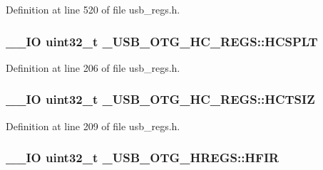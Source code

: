 Definition at line 520 of file usb\-\_\-regs.\-h.

\hypertarget{group___u_s_b___o_t_g___d_r_i_v_e_r_ga25824318899e3094e96b30151084a6c3}{
\subsubsection[{H\-C\-S\-P\-L\-T}]{\setlength{\rightskip}{0pt plus 5cm}\-\_\-\-\_\-\-I\-O {\bf uint32\-\_\-t} \-\_\-\-U\-S\-B\-\_\-\-O\-T\-G\-\_\-\-H\-C\-\_\-\-R\-E\-G\-S\-::\-H\-C\-S\-P\-L\-T}}\label{group___u_s_b___o_t_g___d_r_i_v_e_r_ga25824318899e3094e96b30151084a6c3}


Definition at line 206 of file usb\-\_\-regs.\-h.

\hypertarget{group___u_s_b___o_t_g___d_r_i_v_e_r_gaece38f0014a78ca60398f474dea5a3d0}{
\subsubsection[{H\-C\-T\-S\-I\-Z}]{\setlength{\rightskip}{0pt plus 5cm}\-\_\-\-\_\-\-I\-O {\bf uint32\-\_\-t} \-\_\-\-U\-S\-B\-\_\-\-O\-T\-G\-\_\-\-H\-C\-\_\-\-R\-E\-G\-S\-::\-H\-C\-T\-S\-I\-Z}}\label{group___u_s_b___o_t_g___d_r_i_v_e_r_gaece38f0014a78ca60398f474dea5a3d0}


Definition at line 209 of file usb\-\_\-regs.\-h.

\hypertarget{group___u_s_b___o_t_g___d_r_i_v_e_r_gae044265829e203cac4abdfc133eb8467}{
\subsubsection[{H\-F\-I\-R}]{\setlength{\rightskip}{0pt plus 5cm}\-\_\-\-\_\-\-I\-O {\bf uint32\-\_\-t} \-\_\-\-U\-S\-B\-\_\-\-O\-T\-G\-\_\-\-H\-R\-E\-G\-S\-::\-H\-F\-I\-R}}\label{group___u_s_b___o_t_g___d_r_i_v_e_r_gae044265829e203cac4abdfc133eb8467}



